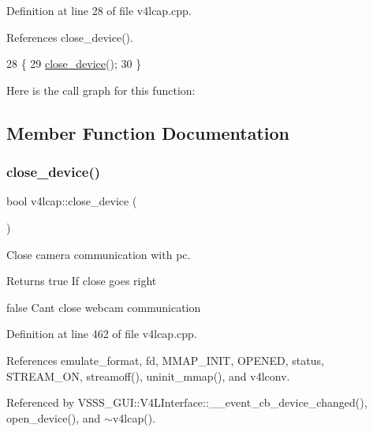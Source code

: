 Definition at line 28 of file v4lcap.\+cpp.



References close\+\_\+device().


\begin{DoxyCode}
28                 \{
29     \hyperlink{classv4lcap_adbb658a6f3248f24ee7926722e76ca43}{close\_device}();
30 \}
\end{DoxyCode}
Here is the call graph for this function\+:


\subsection{Member Function Documentation}
\mbox{\label{classv4lcap_adbb658a6f3248f24ee7926722e76ca43}} 
\subsubsection{\texorpdfstring{close\+\_\+device()}{close\_device()}}
{\footnotesize\ttfamily bool v4lcap\+::close\+\_\+device (\begin{DoxyParamCaption}{ }\end{DoxyParamCaption})}



Close camera communication with pc. 

\begin{DoxyReturn}{Returns}
true If close goes right 

false Can\textquotesingle{}t close webcam communication 
\end{DoxyReturn}


Definition at line 462 of file v4lcap.\+cpp.



References emulate\+\_\+format, fd, M\+M\+A\+P\+\_\+\+I\+N\+IT, O\+P\+E\+N\+ED, status, S\+T\+R\+E\+A\+M\+\_\+\+ON, streamoff(), uninit\+\_\+mmap(), and v4lconv.



Referenced by V\+S\+S\+S\+\_\+\+G\+U\+I\+::\+V4\+L\+Interface\+::\+\_\+\+\_\+event\+\_\+cb\+\_\+device\+\_\+changed(), open\+\_\+device(), and $\sim$v4lcap().


